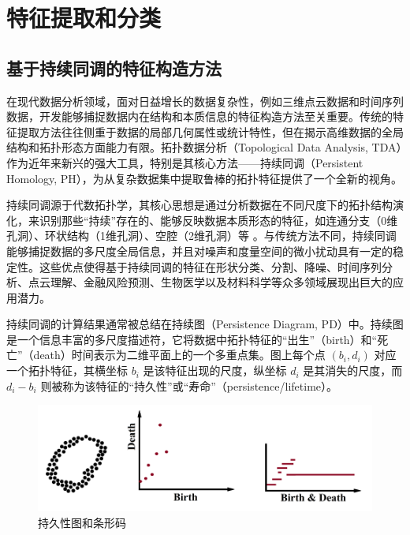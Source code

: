 \section{特征提取和分类} %
\label{chap:feature_extraction}


\subsection{基于持续同调的特征构造方法}
\label{sec:tda_features}
在现代数据分析领域，面对日益增长的数据复杂性，例如三维点云数据和时间序列数据，开发能够捕捉数据内在结构和本质信息的特征构造方法至关重要。传统的特征提取方法往往侧重于数据的局部几何属性或统计特性，但在揭示高维数据的全局结构和拓扑形态方面能力有限。拓扑数据分析（Topological Data Analysis, TDA）作为近年来新兴的强大工具，特别是其核心方法——持续同调（Persistent Homology, PH），为从复杂数据集中提取鲁棒的拓扑特征提供了一个全新的视角\cite{gao2021newell}。

持续同调源于代数拓扑学，其核心思想是通过分析数据在不同尺度下的拓扑结构演化，来识别那些“持续”存在的、能够反映数据本质形态的特征，如连通分支（0维孔洞）、环状结构（1维孔洞）、空腔（2维孔洞）等 。与传统方法不同，持续同调能够捕捉数据的多尺度全局信息，并且对噪声和度量空间的微小扰动具有一定的稳定性。这些优点使得基于持续同调的特征在形状分类、分割、降噪、时间序列分析、点云理解、金融风险预测、生物医学以及材料科学等众多领域展现出巨大的应用潜力。

持续同调的计算结果通常被总结在持续图（Persistence Diagram, PD）中。持续图是一个信息丰富的多尺度描述符，它将数据中拓扑特征的“出生”（birth）和“死亡”（death）时间表示为二维平面上的一个多重点集。图上每个点 $(b_i, d_i)$ 对应一个拓扑特征，其横坐标 $b_i$ 是该特征出现的尺度，纵坐标 $d_i$ 是其消失的尺度，而 $d_i - b_i$ 则被称为该特征的“持久性”或“寿命”（persistence/lifetime）。


\begin{figure}[thbp!]
    \centering
    \includegraphics[width=1.0\textwidth]{figure/出生死亡示意图.png}
    \caption{持久性图和条形码}
    \label{fig:tde_example}
\end{figure}


